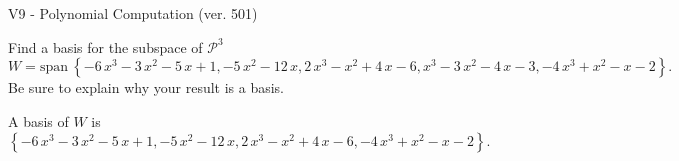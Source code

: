 \begin{exercise}
  \begin{exerciseTitle}V9 - Polynomial Computation (ver. 501)\end{exerciseTitle}
  \begin{exerciseStatement}
    Find a basis for the subspace of \(\mathcal{P}^3\) 
\[W=\mathrm{span}\ \left\{-6 \, x^{3} - 3 \, x^{2} - 5 \, x + 1 , -5 \, x^{2} - 12 \, x , 2 \, x^{3} - x^{2} + 4 \, x - 6 , x^{3} - 3 \, x^{2} - 4 \, x - 3 , -4 \, x^{3} + x^{2} - x - 2\right\}.\]
 Be sure to explain why your result is a basis.


  \end{exerciseStatement}
  \begin{exerciseAnswer}
   A basis of \(W\) is  \(\left\{-6 \, x^{3} - 3 \, x^{2} - 5 \, x + 1 , -5 \, x^{2} - 12 \, x , 2 \, x^{3} - x^{2} + 4 \, x - 6 , -4 \, x^{3} + x^{2} - x - 2\right\}\).
  


  \end{exerciseAnswer}
\end{exercise}